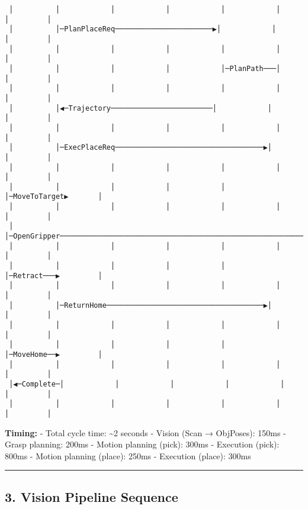 \documentclass[
]{article}
\begin{document}
\begin{verbatim}
 │          │            │            │            │            │           │         │
 │          │─PlanPlaceReq───────────────────────▶│            │           │         │
 │          │            │            │            │            │           │         │
 │          │            │            │            │─PlanPath───│           │         │
 │          │            │            │            │            │           │         │
 │          │◀─Trajectory────────────────────────│            │           │         │
 │          │            │            │            │            │           │         │
 │          │─ExecPlaceReq───────────────────────────────────▶│           │         │
 │          │            │            │            │            │           │         │
 │          │            │            │            │            │─MoveToTarget▶       │
 │          │            │            │            │            │           │         │
 │          │─OpenGripper────────────────────────────────────────────────────────────▶│
 │          │            │            │            │            │           │         │
 │          │            │            │            │            │─Retract───▶         │
 │          │            │            │            │            │           │         │
 │          │─ReturnHome─────────────────────────────────────▶│           │         │
 │          │            │            │            │            │           │         │
 │          │            │            │            │            │─MoveHome──▶         │
 │          │            │            │            │            │           │         │
 │◀─Complete─│            │            │            │            │           │         │
 │          │            │            │            │            │           │         │
\end{verbatim}

\textbf{Timing:} - Total cycle time: \textasciitilde2 seconds - Vision
(Scan → ObjPoses): 150ms - Grasp planning: 200ms - Motion planning
(pick): 300ms - Execution (pick): 800ms - Motion planning (place): 250ms
- Execution (place): 300ms

\begin{center}\rule{0.5\linewidth}{0.5pt}\end{center}

\hypertarget{vision-pipeline-sequence}{%
\subsection{3. Vision Pipeline
Sequence}\label{vision-pipeline-sequence}}
\end{document}
